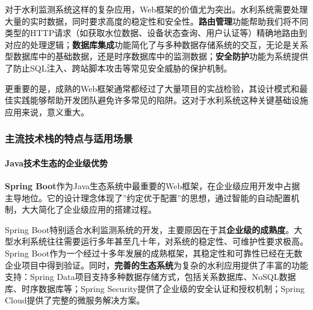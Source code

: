 对于水利监测系统这样的复杂应用，Web框架的价值尤为突出。水利系统需要处理大量的实时数据，同时要求高度的稳定性和安全性。\textbf{路由管理}功能帮助我们将不同类型的HTTP请求（如获取水位数据、设备状态查询、用户认证等）精确地路由到对应的处理逻辑；\textbf{数据库集成}功能简化了与多种数据存储系统的交互，无论是关系型数据库中的基础数据，还是时序数据库中的监测数据；\textbf{安全防护}功能为系统提供了防止SQL注入、跨站脚本攻击等常见安全威胁的保护机制。

更重要的是，成熟的Web框架通常都经过了大量项目的实战检验，其设计模式和最佳实践能够帮助开发团队避免许多常见的陷阱。这对于水利系统这种关键基础设施应用来说，意义重大。

\subsubsection{主流技术栈的特点与适用场景}\label{ux4e3bux6d41ux6280ux672fux6808ux7684ux7279ux70b9ux4e0eux9002ux7528ux573aux666f}

\paragraph{Java技术生态的企业级优势}\label{javaux6280ux672fux751fux6001ux7684ux4f01ux4e1aux7ea7ux4f18ux52bf}

\textbf{Spring Boot}作为Java生态系统中最重要的Web框架，在企业级应用开发中占据主导地位。它的设计理念体现了''约定优于配置''的思想，通过智能的自动配置机制，大大简化了企业级应用的搭建过程。

Spring Boot特别适合水利监测系统的开发，主要原因在于其\textbf{企业级的成熟度}。大型水利系统往往需要运行多年甚至几十年，对系统的稳定性、可维护性要求极高。Spring Boot作为一个经过十多年发展的成熟框架，其稳定性和可靠性已经在无数企业项目中得到验证。同时，\textbf{完善的生态系统}为复杂的水利应用提供了丰富的功能支持：Spring Data项目支持多种数据存储方式，包括关系数据库、NoSQL数据库、时序数据库等；Spring Security提供了企业级的安全认证和授权机制；Spring Cloud提供了完整的微服务解决方案。

